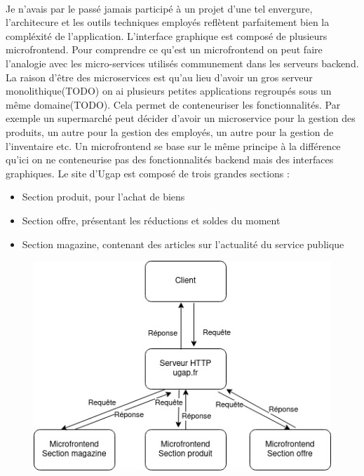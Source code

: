 \documentclass[12pt]{article}
\begin{document}
\begin {sloppypar}
\paragraph{}
Je n'avais par le passé jamais participé à un projet d'une tel envergure, l'architecure et les outils 
techniques employés reflètent parfaitement bien la compléxité de l'application. L'interface graphique 
est composé de plusieurs microfrontend. Pour comprendre ce qu'est un microfrontend on peut faire 
l'analogie avec les micro-services utilisés communement dans les serveurs backend. La raison d'être 
des microservices est qu'au lieu d'avoir un gros serveur monolithique(TODO) on ai plusieurs petites applications 
regroupés sous un même domaine(TODO). Cela permet de conteneuriser les fonctionnalités. Par exemple 
un supermarché peut décider d'avoir un microservice pour la gestion des produits, un autre pour la 
gestion des employés, un autre pour la gestion de l'inventaire etc. Un microfrontend se base sur le même 
principe à la différence qu'ici on ne conteneurise pas des fonctionnalités backend mais des interfaces 
graphiques.
\newpage
Le site d'Ugap est composé de trois grandes sections : 
\begin{itemize}
  \item 
    Section produit, pour l'achat de biens
  \item 
    Section offre, présentant les réductions et soldes du moment
  \item 
    Section magazine, contenant des articles sur l'actualité du service publique
\end{itemize}
\begin{figure}[h]
  \includegraphics[width=\textwidth] {archi_ugap.png}

\end{figure}
\end{sloppypar}
\end{document}
